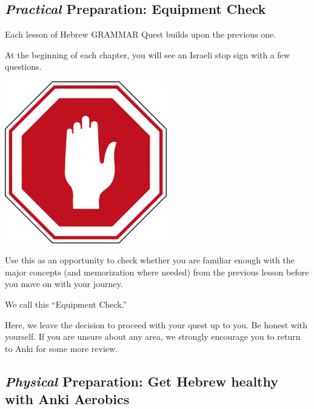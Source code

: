 \documentclass[
]{turabian-researchpaper}
\begin{document}
\hypertarget{practical-preparation-equipment-check}{%
\subsection*{\texorpdfstring{\emph{Practical} Preparation: Equipment Check}{Practical Preparation: Equipment Check}}\label{practical-preparation-equipment-check}}

Each lesson of Hebrew GRAMMAR Quest builds upon the previous one.

At the beginning of each chapter, you will see an Israeli stop sign with a few questions.

\begin{center}\includegraphics[width=200pt]{images/stopil} \end{center}

Use this as an opportunity to check whether you are familiar enough with the major concepts (and memorization where needed) from the previous lesson before you move on with your journey.

We call this ``Equipment Check.''

Here, we leave the decision to proceed with your quest up to you. Be honest with yourself. If you are unsure about any area, we strongly encourage you to return to Anki for some more review.

\hypertarget{physical-preparation-get-hebrew-healthy-with-anki-aerobics}{%
\subsection*{\texorpdfstring{\emph{Physical} Preparation: Get Hebrew healthy with Anki Aerobics}{Physical Preparation: Get Hebrew healthy with Anki Aerobics}}\label{physical-preparation-get-hebrew-healthy-with-anki-aerobics}}
\end{document}
